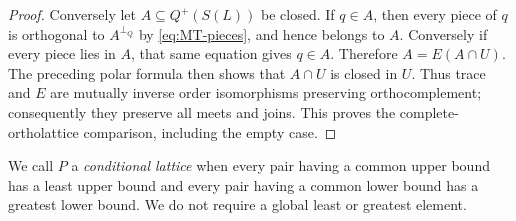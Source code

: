 \begin{proof}
Conversely let $A\subseteq Q^+(S(L))$ be closed. If $q\in A$, then
every piece of $q$ is orthogonal to $A^{\perp_Q}$ by
\eqref{eq:MT-pieces}, and hence belongs to $A$. Conversely if every
piece lies in $A$, that same equation gives $q\in A$. Therefore
$A=E(A\cap U)$. The preceding polar formula then shows that $A\cap U$
is closed in $U$. Thus trace and $E$ are mutually inverse order
isomorphisms preserving orthocomplement; consequently they preserve
all meets and joins. This proves the complete-ortholattice comparison,
including the empty case.
\end{proof}

We call $P$ a \emph{conditional lattice} when every pair having a common
upper bound has a least upper bound and every pair having a common
lower bound has a greatest lower bound. We do not require a global
least or greatest element.

